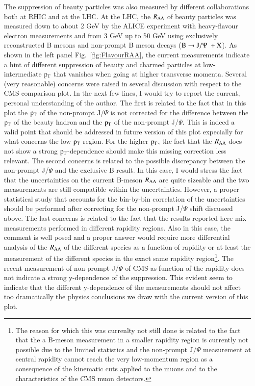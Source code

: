 \documentclass{webofc}
\begin{document}
The suppression of beauty particles was also measured by different collaborations both at RHIC and at the LHC. At the LHC, the $R_{\mathrm{AA}}$ of beauty 
particles was measured down to about 2 GeV by the ALICE experiment with heavy-flavour electron measurements and from 3 GeV up to 50 GeV 
using exclusively reconstructed B mesons and non-prompt B meson decays ($\rm B \rightarrow J/\Psi \hspace{0.1cm}+ X$). As shown in the left panel Fig.~\ref{fig:FlavourRAA}, 
the current measurements indicate a hint of different suppression of beauty and charmed particles at low-intermediate $\rm p_{\rm T} $ that vanishes when 
going at higher transverse momenta. Several (very reasonable) concerns were raised in several discussion with respect to the CMS comparison plot. 
In the next few lines, I would try to report the current, personal understanding of the author. 
The first is related to the fact that in this plot the $\rm p_{\rm T} $ of the non-prompt J/$\Psi$ is not corrected for the difference between the $\rm p_{\rm T} $ of the beauty 
hadron and the $\rm p_{\rm T} $ of the non-prompt J/$\Psi$. This is indeed a valid point that should be addressed in future version of this plot expecially for 
what concerns the low-$\rm p_{\rm T} $ region. For the higher-$\rm p_{\rm T} $, the fact that the $R_{\mathrm{AA}}$ does not show a strong $\rm p_{\rm T} $-dependence should make this 
missing correction less relevant. The second concerns is related to the possible discrepancy between the non-prompt J/$\Psi$  and the exclusive B result. 
In this case, I would stress the fact that the uncertainties on the current B-meson $R_{\mathrm{AA}}$ are quite sizeable and the two measurements are still compatible 
within the uncertainties. However, a proper statistical study that accounts for the bin-by-bin correlation of the uncertainties should be performed 
after correcting for the non-prompt J/$\Psi$ shift discussed above. The last concerns is related to the fact that the results reported here mix measurements 
performed in different rapidity regions. Also in this case, the comment is well posed and a proper answer would require more differential analysis of 
the $R_{\mathrm{AA}}$ of the different species as a function of rapidity or at least the measurement of the different species in the exact same rapidity region\footnote{The reason for which this was currenlty not still done
is related to the fact that the a B-meson measurement in a smaller rapidity region is currently not possible due to the limited statistics and the non-prompt J/$\Psi$ measurement at central rapidity cannot 
reach the very low-momentum region as a consequence of the kinematic cuts applied to the muons and to the characteristics of the CMS muon detectors.}. 
The recent measurement of non-prompt J/$\Psi$ of CMS as function of the rapidity does not indicate a strong y-dependence of the suppression. This evident 
seem to indicate that the different y-dependence of the measurements should not affect too dramatically the physics conclusions we draw with the current version 
of this plot. 
\end{document}
